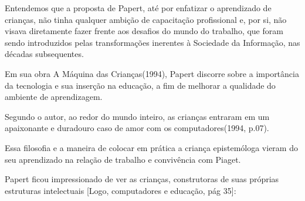 \documentclass[
12pt,		%
openright,	%
twoside,  %
a4paper,			%
chapter=TITLE,		%
english,			%
french,				%
spanish,			%
brazil				%
]{USPSC-classe/USPSC}
\begin{document}
Entendemos que a proposta de Papert, at\'e por enfatizar o aprendizado de crian\c{c}as, n\~ao tinha qualquer ambi\c{c}\~ao de capacita\c{c}\~ao profissional e, por si, n\~ao visava diretamente fazer frente aos desafios do \textquotedbl mundo do trabalho\textquotedbl , que foram sendo introduzidos pelas transforma\c{c}\~oes inerentes \`a Sociedade da Informa\c{c}\~ao, nas d\'ecadas subsequentes.









Em sua obra \textquotedbl A M\'aquina das Crian\c{c}as\textquotedbl  (1994), Papert discorre sobre a import\^ancia da tecnologia e sua inser\c{c}\~ao na educa\c{c}\~ao, a fim de melhorar a qualidade do ambiente de aprendizagem.










\noindent\begin{center}\mbox{\centering{}}\end{center}


Segundo o autor, \textquotedbl ao redor do mundo inteiro, as crian\c{c}as entraram em um apaixonante e duradouro caso de amor com os computadores\textquotedbl  (1994, p.07).









Essa filosofia e a maneira de colocar em pr\'atica a crian\c{c}a epistem\'ologa vieram do seu aprendizado na rela\c{c}\~ao de trabalho e conviv\^encia com Piaget.









Papert ficou impressionado de ver as crian\c{c}as, construtoras de suas pr\'oprias estruturas intelectuais [Logo, computadores e educa\c{c}\~ao, p\'ag 35]:
\end{document}
